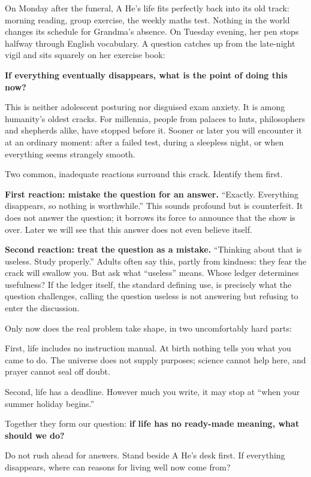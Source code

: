 On Monday after the funeral, A He's life fits perfectly back into its old track: morning reading, group exercise, the weekly maths test. Nothing in the world changes its schedule for Grandma's absence. On Tuesday evening, her pen stops halfway through English vocabulary. A question catches up from the late-night vigil and sits squarely on her exercise book:

\textbf{If everything eventually disappears, what is the point of doing this now?}

This is neither adolescent posturing nor disguised exam anxiety. It is among humanity's oldest cracks. For millennia, people from palaces to huts, philosophers and shepherds alike, have stopped before it. Sooner or later you will encounter it at an ordinary moment: after a failed test, during a sleepless night, or when everything seems strangely smooth.

Two common, inadequate reactions surround this crack. Identify them first.

\textbf{First reaction: mistake the question for an answer.} ``Exactly. Everything disappears, so nothing is worthwhile.'' This sounds profound but is counterfeit. It does not answer the question; it borrows its force to announce that the show is over. Later we will see that this answer does not even believe itself.

\textbf{Second reaction: treat the question as a mistake.} ``Thinking about that is useless. Study properly.'' Adults often say this, partly from kindness: they fear the crack will swallow you. But ask what ``useless'' means. Whose ledger determines usefulness? If the ledger itself, the standard defining use, is precisely what the question challenges, calling the question useless is not answering but refusing to enter the discussion.

Only now does the real problem take shape, in two uncomfortably hard parts:

First, life includes no instruction manual. At birth nothing tells you what you came to do. The universe does not supply purposes; science cannot help here, and prayer cannot seal off doubt.

Second, life has a deadline. However much you write, it may stop at ``when your summer holiday begins.''

Together they form our question: \textbf{if life has no ready-made meaning, what should we do?}

Do not rush ahead for answers. Stand beside A He's desk first. If everything disappears, where can reasons for living well now come from?

